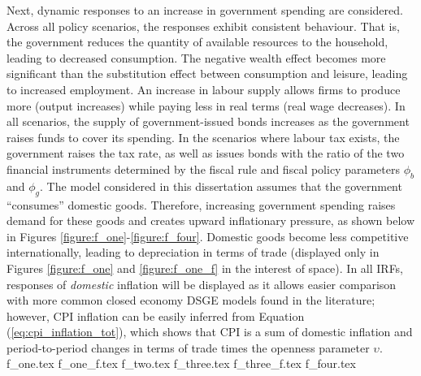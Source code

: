 Next, dynamic responses to an increase in government spending are considered. Across all policy scenarios, the responses exhibit consistent behaviour. That is, the government reduces the quantity of available resources to the household, leading to decreased consumption. The negative wealth effect becomes more significant than the substitution effect between consumption and leisure, leading to increased employment. An increase in labour supply allows firms to produce more (output increases) while paying less in real terms (real wage decreases). In all scenarios, the supply of government-issued bonds increases as the government raises funds to cover its spending. In the scenarios where labour tax exists, the government raises the tax rate, as well as issues bonds with the ratio of the two financial instruments determined by the fiscal rule and fiscal policy parameters $\phi_b$ and $\phi_g$. The model considered in this dissertation assumes that the government ``consumes'' domestic goods. Therefore, increasing government spending raises demand for these goods and creates upward inflationary pressure, as shown below in Figures \ref{figure:f_one}-\ref{figure:f_four}. Domestic goods become less competitive internationally, leading to depreciation in terms of trade (displayed only in Figures \ref{figure:f_one} and \ref{figure:f_one_f} in the interest of space). In all IRFs, responses of \textit{domestic} inflation will be displayed as it allows easier comparison with more common closed economy DSGE models found in the literature; however, CPI inflation can be easily inferred from Equation (\ref{eq:cpi_inflation_tot}), which shows that CPI is a sum of domestic inflation and period-to-period changes in terms of trade times the openness parameter $\upsilon$.
{f_one.tex}
{f_one_f.tex}
{f_two.tex}
{f_three.tex}
{f_three_f.tex}
{f_four.tex}
